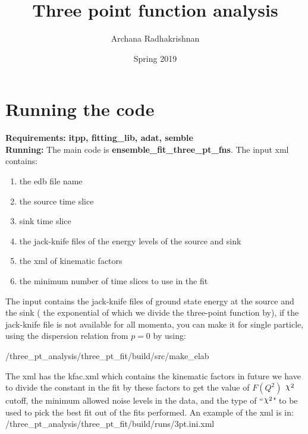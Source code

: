 \documentclass[10pt]{article}
\title{Three point function analysis}
\author{Archana Radhakrishnan}
\date{Spring 2019}
\DeclareRobustCommand{\rchi}{{\mathpalette\irchi\relax}}
\newcommand{\irchi}[2]{\raisebox{\depth}{$#1\chi$}} %
\begin{document}
\maketitle

\section{Running the code} 
\textbf{Requirements:} \textbf{{\myfont itpp, fitting\_lib, adat, semble}}\\
\textbf{Running:} The main code is \textbf{{\myfont ensemble_fit_three_pt_fns}}. The input xml contains:
\begin{enumerate}
 \item the edb file name
 \item the source time slice
 \item sink time slice
 \item the jack-knife files of the energy levels of the source and sink
 \item the xml of kinematic factors 
 \item the minimum number of time slices to use in the fit
\end{enumerate}
  The input contains the jack-knife files of ground state energy at the source and the sink ( the exponential of which we divide the three-point function by), if the jack-knife file is not available for all momenta, you can make it for single particle, using the dispersion relation from $p=0$ by using:
  \begin{center} {\myfont /three_pt_analysis/three_pt_fit/build/src/make_elab}\end{center}
The xml has the kfac.xml which contains the kinematic factors in future we have to divide the constant in the fit by these factors to get the value of  $F(Q^{2})$ $\rchi^2$ cutoff, the minimum allowed noise levels in the data, and the type of ``$\rchi^2$" to be used to pick the best fit out of the fits performed. An example of the xml is in:\\ {\myfont /three_pt_analysis/three_pt_fit/build/runs/3pt.ini.xml} \par
\end{document}
